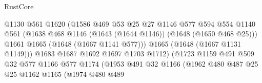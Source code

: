 \begin{lexlean}{RustCore}
\begin{coremodule}
                                          @1130
                                          @561
                                          @1620
                                          (@1586
                                            @469
                                            @53
                                            @25
                                            @27
                                            @1146
                                            @577
                                            @594
                                            @554
                                            @1140
                                            @561
                                            (@1638
                                              @468
                                              @1146
                                              (@1643 (@1644 @1146))
                                              (@1648 (@1650 @468 @25)))
                                            @1661
                                            @1665
                                            (@1648 (@1667 @1141 @577)))
                                          @1665
                                          (@1648 (@1667 @1131 @1149)))
                                        @1683
                                        @1687
                                        @1692
                                        @1697
                                        @1703
                                        @1712)
                                      (@1723
                                        @1159
                                        @491
                                        @509
                                        @32
                                        @577
                                        @1166
                                        @577
                                        @1174
                                        (@1953
                                          @491
                                          @32
                                          @1166
                                          (@1962
                                            @480
                                            @487
                                            @25
                                            @25
                                            @1162
                                            @1165
                                            (@1974
                                              @480
                                              @489

\end{coremodule}
\end{lexlean}
